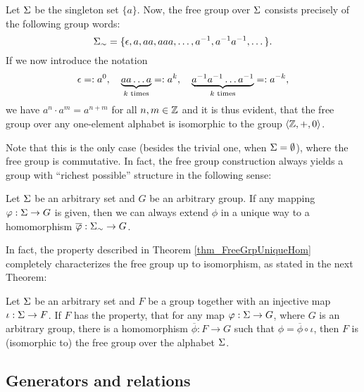 \begin{example}
Let $\Sigma$ be the singleton set $\{a\}$. Now, the free group over $\Sigma$ consists precisely of the following group words:
\begin{equation*}
{\Sigma}_{\sim} = \{\epsilon, a, aa, aaa, \dots, {a}^{-1}, {a}^{-1}{a}^{-1},\dots\}.
\end{equation*}
If we now introduce the notation
\begin{equation*}
\epsilon =: a^0, \quad 
\underbrace{a a \dots a}_{k \text{ times}} =: a^k, \quad
\underbrace{{a}^{-1} {a}^{-1} \dots {a}^{-1}}_{k \text{ times}} =: a^{-k},
\end{equation*}
we have $a^n \cdot a^m = a^{n+m}$ for all $n,m \in \mathbb{Z}$ and it is thus evident, that the free group over any one-element alphabet is isomorphic to the group $\langle \mathbb{Z}, +, 0 \rangle$. 

Note that this is the only case (besides the trivial one, when $\Sigma = \emptyset$), where the free group is commutative. In fact, the free group construction always yields a group with ``richest possible'' structure in the following sense:

\begin{theorem}
\label{thm_FreeGrpUniqueHom}
Let $\Sigma$ be an arbitrary set and $G$ be an arbitrary group. If any mapping $\varphi : \Sigma \to G$ is given, then we can always extend $\phi$ in a unique way to a homomorphism $\overline{\varphi}: {\Sigma}_{\sim} \to G$.
\end{theorem}

In fact, the property described in Theorem \ref{thm_FreeGrpUniqueHom} completely characterizes the free group up to isomorphism, as stated in the next Theorem:

\begin{theorem}
\label{thm_FreeGrpUnivMapProp}
Let $\Sigma$ be an arbitrary set and $F$ be a group together with an injective map $\iota : \Sigma \to F$. If $F$ has the property, that for any map $\varphi : \Sigma \to G$, where $G$ is an arbitrary group, there is a homomorphism $\overline{\phi} : F \to G$ such that $\phi = \overline{\phi} \circ \iota$,
then $F$ is (isomorphic to) the free group over the alphabet $\Sigma$.
\end{theorem}

\end{example}

\subsection{Generators and relations}

